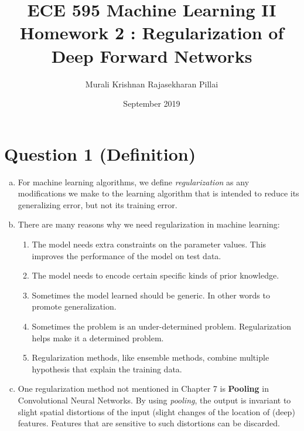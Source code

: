 \documentclass[fleqn]{article}
\title{
  ECE 595 Machine Learning II \\
  \large Homework 2 : Regularization of Deep Forward Networks}
\author{Murali Krishnan Rajasekharan Pillai}
\date{September 2019}
\begin{document}
\maketitle
\section*{Question 1 (Definition)}
\begin{enumerate}[a)]
    \item 
    For machine learning algorithms, we define \textit{regularization} as any modifications we make to the learning
    algorithm that is intended to reduce its generalizing error, but not its training error.
    \item %
    There are many reasons why we need regularization in machine learning:
    \begin{enumerate}
    	\item The model needs extra constraints on the parameter values. This improves the performance of the
	model on test data.
	\item The model needs to encode certain specific kinds of prior knowledge. 
	\item Sometimes the model learned should be generic. In other words to promote generalization.
	\item Sometimes the problem is an under-determined problem. Regularization helps make it a determined 
	problem.
	\item Regularization methods, like ensemble methods, combine multiple hypothesis that explain the training 
	data.
    \end{enumerate}    
    \item %
    	One regularization method not mentioned in Chapter 7 is \textbf{Pooling} in Convolutional Neural Networks. 
	By using \textit{pooling}, the output is invariant to slight spatial distortions of the input (slight changes of the 
	location of (deep) features. Features that are sensitive to such distortions can be discarded.
    
\end{enumerate}
\end{document}
